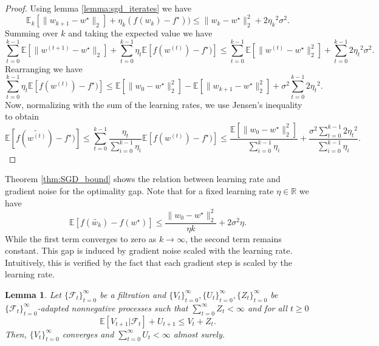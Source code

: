 \documentclass[12pt]{article}
\newtheorem{lemma}[lemma]{Lemma}
\theoremstyle{definition}
\numberwithin{equation}{section}
\newcommand{\R}{\mathbb{R}}
\newcommand{\E}{\mathbb{E}}
\newcommand{\CF}{\mathcal{F}}
\newcommand{\ev}[1]{\mathbb{E}\left[{#1}\right]}
\newcommand{\norm}[1]{\lVert{#1}\rVert_2}
\begin{document}
\begin{proof}
  Using lemma \autoref{lemma:sgd_iterates} we have
  \begin{equation*}
    \E_k[\norm{w_{k+1} - w^\star}] + \eta_k (f(w_{k}) - f^\star)) \leq \norm{w_{k} - w^\star}^2 + 2{\eta_k}^2\sigma^2.
  \end{equation*}
  Summing over $k$ and taking the expected value we have
  \begin{equation*}
    \sum_{t=0}^{k-1}\ev{\norm{w^{(t+1)} - w^\star}} + \sum_{t=0}^{k-1} \eta_t \ev{f(w^{(t)}) - f^\star)} \leq \sum_{t=0}^{k-1} \ev{\norm{w^{(t)} - w^\star}^2} + \sum_{t=0}^{k-1} 2{\eta_t}^2\sigma^2.
  \end{equation*}
  Rearranging we have
  \begin{equation*}
    \sum_{t=0}^{k-1} \eta_t \ev{f(w^{(t)}) - f^\star)} \leq \ev{\norm{w_{0} - w^\star}^2} - \ev{\norm{w_{k+1} - w^\star}^2} + \sigma^2\sum_{t=0}^{k-1} 2{\eta_t}^2.
  \end{equation*}
  Now, normalizing with the sum of the learning rates, we use Jensen's inequality to obtain
  \begin{equation*}
    \ev{f(\widetilde{w^{(t)}}) - f^\star)} \leq \sum_{t=0}^{k-1} \frac{\eta_t}{\sum_{i=0}^{k-1}\eta_i} \ev{f(w^{(t)}) - f^\star)} \leq \frac{\ev{\norm{w_{0} - w^\star}^2}}{\sum_{i=0}^{k-1}\eta_i} + \frac{\sigma^2\sum_{t=0}^{k-1} 2{\eta_t}^2}{\sum_{i=0}^{k-1}\eta_i}.
  \end{equation*}
\end{proof}

Theorem \autoref{thm:SGD_bound} shows the relation between learning rate and gradient noise for the optimality gap. Note that for a fixed learning rate $\eta \in \R$ we have
\begin{equation*}
  \E [f(\widetilde{w_{k}}) - f(w^\star)] \leq \frac{\norm{w_{0} - w^\star}^2}{\eta k} + 2 \sigma^2 \eta.
\end{equation*}
While the first term converges to zero as $k \rightarrow \infty$, the second term remains constant. This gap is induced by gradient noise scaled with the learning rate. Intuitively, this is verified by the fact that each gradient step is scaled by the learning rate.
\begin{lemma}
  Let $\{\CF_t\}_{t=0}^\infty$ be a filtration and $\{V_t\}_{t=0}^\infty, \{U_t\}_{t=0}^\infty, \{Z_t\}_{t=0}^\infty$ be $\{\CF_t\}_{t=0}^\infty$-adapted nonnegative processes such that $\sum_{t=0}^\infty Z_t < \infty$ and for all $t \geq 0$
  \begin{equation*}
    \ev{V_{t+1}|\CF_t} + U_{t+1} \leq V_t + Z_t.
  \end{equation*}
  Then, $\{V_t\}_{t=0}^\infty$ converges and $\sum_{t=0}^\infty U_t < \infty$ almost surely.
\end{lemma}
\end{document}
